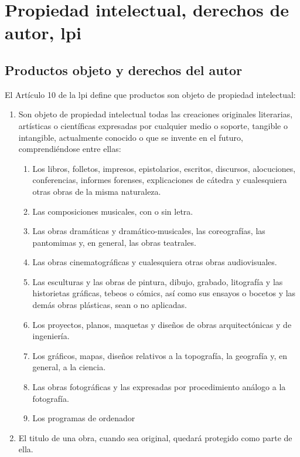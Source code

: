 
\section{Propiedad intelectual, derechos de autor, \gls{lpi}}

\subsection{Productos objeto y derechos del autor}

El Artículo 10 de la \gls{lpi} define que productos son objeto de propiedad intelectual:
\begin{enumerate}[label=\textbf{\arabic*.}]
    \item Son objeto de propiedad intelectual todas las creaciones originales literarias, artísticas o científicas expresadas por cualquier medio o soporte, tangible o intangible, actualmente conocido o que se invente en el futuro, comprendiéndose entre ellas:
          \begin{enumerate}[label=\textbf{\alph*)}]
              \item Los libros, folletos, impresos, epistolarios, escritos, discursos, alocuciones, conferencias, informes forenses, explicaciones de cátedra y cualesquiera otras obras de la misma naturaleza.
              \item Las composiciones musicales, con o sin letra.
              \item Las obras dramáticas y dramático-musicales, las coreografías, las pantomimas y, en general, las obras teatrales.
              \item Las obras cinematográficas y cualesquiera otras obras audiovisuales.
              \item Las esculturas y las obras de pintura, dibujo, grabado, litografía y las historietas gráficas, tebeos o cómics, así como sus ensayos o bocetos y las demás obras plásticas, sean o no aplicadas.
              \item Los proyectos, planos, maquetas y diseños de obras arquitectónicas y de ingeniería.
              \item Los gráficos, mapas, diseños relativos a la topografía, la geografía y, en general, a la ciencia.
              \item Las obras fotográficas y las expresadas por procedimiento análogo a la fotografía.
              \item Los programas de ordenador
          \end{enumerate}
    \item El titulo de una obra, cuando sea original, quedará protegido como parte de ella.
\end{enumerate}


